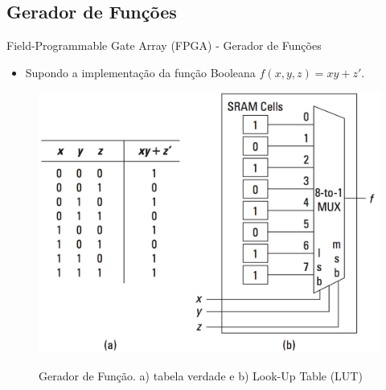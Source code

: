 \documentclass[aspectratio=169]{beamer}
\begin{document}
	\subsection{Gerador de Funções}
	\begin{frame}{Field-Programmable Gate Array (FPGA) - Gerador de Funções}
		\begin{itemize}
			\item Supondo a implementação da função Booleana $f(x, y, z) = xy + z'$.
		\end{itemize}
		
		\begin{figure}[h]
			\centering
			\caption{Gerador de Função. a) tabela verdade e b) Look-Up Table (LUT)}
			\includegraphics[height=0.68\textheight]{img/print/funcao-geradora.png}
			\label{fig:funcao-geradora}
		\end{figure}
	\end{frame}
	
\end{document}
